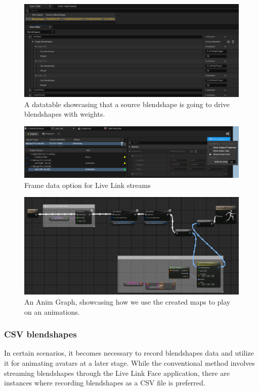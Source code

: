 \documentclass{uva-inf-article}
\begin{document}
\begin{figure}[hbt!]
    \centering
    \includegraphics[width=\textwidth]{imgs/blendshapeRemapSnippet.png}
    \caption{A datatable showcasing that a source blendshape is going to drive blendshapes with weights.}
    \label{fig:datatablesnippet}
\end{figure}


\begin{figure}[hbt!]
    \centering
    \includegraphics[width=\textwidth]{imgs/livelinkoptions.png}
    \caption{Frame data option for Live Link streams}
    \label{fig:livelinkoptions}
\end{figure}

\begin{figure}[hbt!]
    \centering
    \includegraphics[width=1\textwidth]{imgs/ssAndLLFAnimGraph.png}
    \caption{An Anim Graph, showcasing how we use the created maps to play on an animations.}
    \label{fig:animgraphssLLF}
\end{figure}


\subsubsection{CSV blendshapes}
In certain scenarios, it becomes necessary to record blendshapes data and utilize it for animating avatars at a later stage. While the conventional method involves streaming blendshapes through the Live Link Face application, there are instances where recording blendshapes as a CSV file is preferred.
\end{document}
